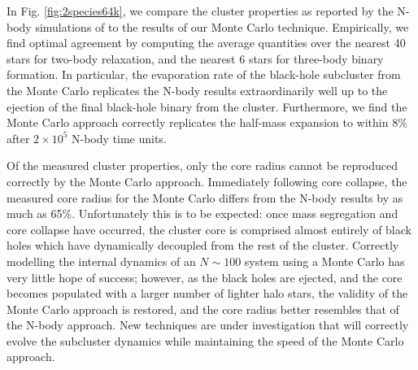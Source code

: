 \documentclass[11pt,a4paper]{emulateapj}
\begin{document}
In Fig. \ref{fig:2species64k}, we compare the cluster properties as reported by
the N-body simulations of \cite{2013MNRAS.432.2779B} to the results of our Monte
Carlo technique.  Empirically, we find optimal agreement by computing the
average quantities over the nearest 40 stars for two-body relaxation, and the
nearest 6 stars for three-body binary formation.  In particular, the 
evaporation rate of the black-hole subcluster from the Monte Carlo replicates
the N-body results extraordinarily well up to the ejection of the final
black-hole binary from the cluster.  Furthermore, we find the Monte Carlo
approach correctly replicates the half-mass expansion to within 8\% after
$2\times10^5$ N-body time units.  

Of the measured cluster properties, only the core radius cannot be
reproduced correctly by the Monte Carlo approach.  Immediately following core
collapse, the measured core radius for the Monte Carlo differs from the N-body
results by as much as 65\%.  Unfortunately this is to be expected: once mass
segregation and core collapse have occurred, the cluster core is comprised almost
entirely of black holes which have dynamically decoupled from the rest of the
cluster.  Correctly modelling the internal dynamics of an $N\sim100$ system using
a Monte Carlo has very little hope of success; however, as the black holes are
ejected, and the core becomes populated with a larger number of lighter halo
stars, the validity of the Monte Carlo approach is restored, and the core
radius better resembles that of the N-body approach.  New techniques are under
investigation that will correctly evolve the subcluster dynamics while
maintaining the speed of the Monte Carlo approach. 


{}
\end{document}
